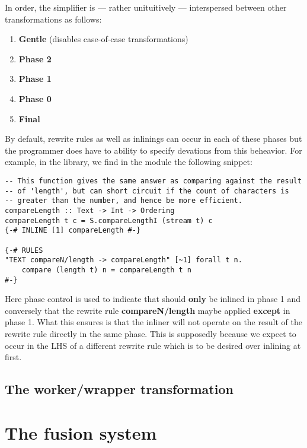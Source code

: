In order, the simplifier is --- rather unituitively --- interspersed between other transformations as follows:

\begin{enumerate}
  \item \textbf{Gentle} (disables case-of-case transformations)
  \item \textbf{Phase 2}
  \item \textbf{Phase 1}
  \item \textbf{Phase 0}
  \item \textbf{Final}
\end{enumerate}

By default, rewrite rules as well as inlinings can occur in each of these phases but the programmer does have to ability
to specify devations from this beheavior. For example, in the  library, we find in the  module
the following snippet:

\begin{listing}[H]
\begin{verbatim}
-- This function gives the same answer as comparing against the result
-- of 'length', but can short circuit if the count of characters is
-- greater than the number, and hence be more efficient.
compareLength :: Text -> Int -> Ordering
compareLength t c = S.compareLengthI (stream t) c
{-# INLINE [1] compareLength #-}

{-# RULES
"TEXT compareN/length -> compareLength" [~1] forall t n.
    compare (length t) n = compareLength t n
#-}
\end{verbatim}
\end{listing}

Here phase control is used to indicate that  should \textbf{only} be inlined in phase 1 and conversely
that the rewrite rule \textbf{compareN/length} maybe applied \textbf{except} in phase 1. What this ensures is that the inliner
will not operate on the result of the rewrite rule directly in the same phase. This is supposedly because we expect 
to occur in the LHS of a different rewrite rule which is to be desired over inlining at first.

\subsection{The worker/wrapper transformation}

\section{The fusion system}
\label{section:background:fusion}

